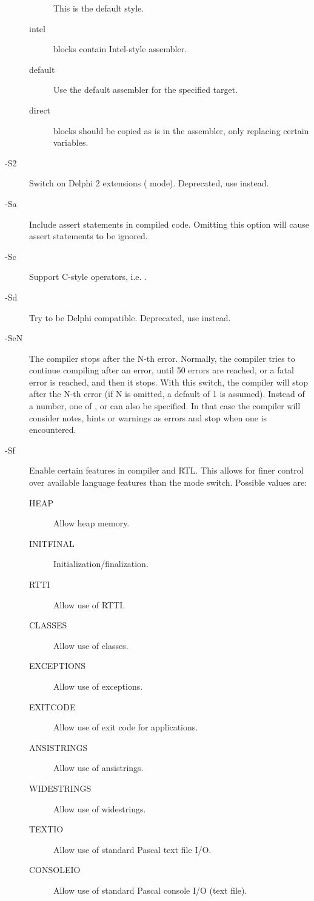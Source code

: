 \begin{description}
\begin{description}
This is the default style.
\item [intel]  blocks contain Intel-style assembler.
\item [default] Use the default assembler for the specified target.
\item [direct]  blocks should be copied as is in the assembler,
only replacing certain variables. 
\end{description}
\item [-S2]  Switch on Delphi 2 extensions ( mode). 
Deprecated, use  instead.
\item [-Sa]  Include assert statements in compiled code. Omitting 
this option will cause assert statements to be ignored.
\item [-Sc]  Support C-style operators, i.e. .
\item [-Sd]  Try to be Delphi compatible. Deprecated, use
 instead. 
\item [-SeN]  The compiler stops after the N-th error. Normally,
the compiler tries to continue compiling after an error, until 50 errors are
reached, or a fatal error is reached, and then it stops. With this switch,
the compiler will stop after the N-th error (if N is omitted, a default of 1
is assumed). Instead of a number, one of ,  or  can also be
specified. 
In that case the compiler will consider notes, hints or warnings as errors and 
stop when one is encountered.
\item[-Sf] Enable certain features in compiler and RTL. This allows for
finer control over available language features than the mode switch. 
Possible values are:
\begin{description}
\item[HEAP] Allow heap memory.
\item[INITFINAL] Initialization/finalization.
\item[RTTI] Allow use of RTTI.
\item[CLASSES] Allow use of classes.
\item[EXCEPTIONS] Allow use of exceptions.
\item[EXITCODE] Allow use of exit code for applications.
\item[ANSISTRINGS] Allow use of ansistrings.
\item[WIDESTRINGS] Allow use of widestrings.
\item[TEXTIO] Allow use of standard  Pascal text file I/O.
\item[CONSOLEIO] Allow use of standard  Pascal console I/O (text file).

\end{description}
\end{description}
